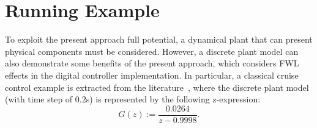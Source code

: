 \documentclass{sig-alternate-05-2015}
\begin{document}

%

\section{Running Example} \label{sec:running-ex}

To exploit the present approach full potential, a dynamical plant that can present 
physical components must be considered. However, a discrete plant model can also demonstrate 
some benefits of the present approach, which considers FWL effects in the digital 
controller implementation. In particular, a classical cruise control example 
is extracted from the literature~\cite{Astrom08}, where the discrete plant model (with time step
of $0.2$s) is represented by the following z-expression:
%
\begin{equation}
\label{Eq:running-example-plant}
G\left(z\right) := \frac{0.0264}{z-0.9998}.
\end{equation}
\end{document}
